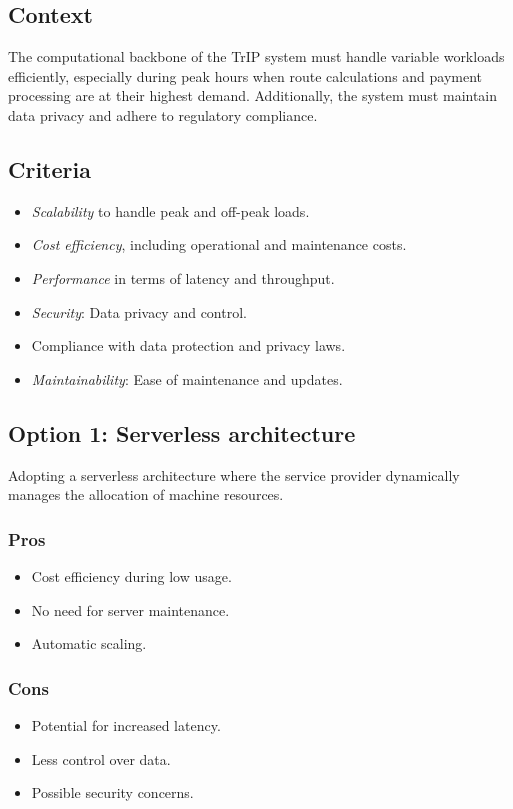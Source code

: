 \subsection*{Context}
The computational backbone of the TrIP system must handle variable workloads efficiently, especially during peak hours when route calculations and payment processing are at their highest demand. Additionally, the system must maintain data privacy and adhere to regulatory compliance.

\subsection*{Criteria}
\begin{itemize}
    \item \textit{Scalability} to handle peak and off-peak loads.
    \item \textit{Cost efficiency}, including operational and maintenance costs.
    \item \textit{Performance} in terms of latency and throughput.
    \item \textit{Security}: Data privacy and control.
    \item Compliance with data protection and privacy laws.
    \item \textit{Maintainability}: Ease of maintenance and updates.
\end{itemize}

\subsection*{Option 1: Serverless architecture}
Adopting a serverless architecture where the service provider dynamically manages the allocation of machine resources.
\subsubsection*{Pros}
\begin{itemize}
    \item Cost efficiency during low usage.
    \item No need for server maintenance.
    \item Automatic scaling.
\end{itemize}
\subsubsection*{Cons}
\begin{itemize}
    \item Potential for increased latency.
    \item Less control over data.
    \item Possible security concerns.
\end{itemize}

